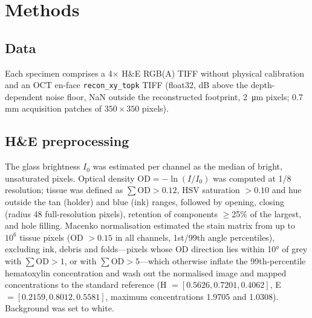\documentclass[9pt,twocolumn]{extarticle}
\begin{document}
\section{Methods}
\subsection{Data} Each specimen comprises a 4$\times$ H\&E RGB(A) TIFF without physical calibration and an OCT en-face \texttt{recon\_xy\_topk} TIFF (float32, dB above the depth-dependent noise floor, NaN outside the reconstructed footprint, \SI{2}{\micro\metre} pixels; 0.7\,mm acquisition patches of $350\times350$ pixels).

\subsection{H\&E preprocessing} The glass brightness $I_0$ was estimated per channel as the median of bright, unsaturated pixels. Optical density $\mathrm{OD}=-\ln(I/I_0)$ was computed at 1/8 resolution; tissue was defined as $\sum\mathrm{OD}>0.12$, HSV saturation $>0.10$ and hue outside the tan (holder) and blue (ink) ranges, followed by opening, closing (radius 48 full-resolution pixels), retention of components $\ge$25\% of the largest, and hole filling. Macenko normalisation\cite{macenko2009} estimated the stain matrix from up to $10^6$ tissue pixels (OD $>0.15$ in all channels, 1st/99th angle percentiles), excluding ink, debris and folds---pixels whose OD direction lies within \ang{10} of grey with $\sum\mathrm{OD}>1$, or with $\sum\mathrm{OD}>5$---which otherwise inflate the 99th-percentile hematoxylin concentration and wash out the normalised image and mapped concentrations to the standard reference (H $=[0.5626,0.7201,0.4062]$, E $=[0.2159,0.8012,0.5581]$, maximum concentrations 1.9705 and 1.0308). Background was set to white.
\end{document}
